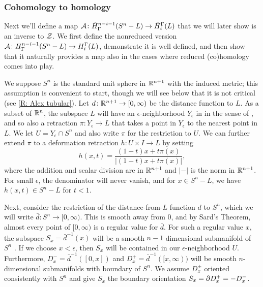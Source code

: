 \subsubsection{Cohomology to homology}
Next we'll define a map $\mathcal{A} \colon \tilde H^{n-i-1}_\Gamma(S^n-L) \to \tilde H_i^\Gamma(L)$ that we will later show is an inverse to $\mathcal{Z}$.
We first define the nonreduced version $\mathcal{A} \colon H^{n-i-1}_\Gamma(S^n-L) \to H_i^\Gamma(L)$, demonstrate it is well defined, and then show that it naturally provides a map also in the cases where reduced (co)homology comes into play.

We suppose $S^n$ is the standard unit sphere in $\mathbb{R}^{n+1}$ with the induced metric; this assumption is convenient to start, though we will see below that it is not critical (see \cref{R: Alex tubular}).
Let $d \colon \mathbb{R}^{n+1} \to [0,\infty)$ be the distance function to $L$.
As a subset of $\mathbb{R}^n$, the subspace $L$ will have an $\epsilon$-neighborhood $Y_\epsilon$ in in the sense of \cite[Section 2.3]{GuPo74}, and so also a retraction $\pi \colon Y_\epsilon \to L$ that takes a point in $Y_\epsilon$ to the nearest point in $L$.
We let $U = Y_\epsilon \cap S^n$ and also write $\pi$ for the restriction to $U$.
We can further extend $\pi$ to a deformation retraction $h \colon U \times I \to L$ by setting
\begin{equation}\label{E: alex retraction}
	h(x,t) = \frac{(1-t)x + t\pi(x)}{|(1-t)x + t\pi(x)|},
\end{equation}
where the addition and scalar division are in $\mathbb{R}^{n+1}$ and $|-|$ is the norm in $\mathbb{R}^{n+1}$.
For small $\epsilon$, the denominator will never vanish, and for $x \in S^n -L$, we have $h(x,t) \in S^n -L$ for $t < 1$.

Next, consider the restriction of the distance-from-$L$ function $d$ to $S^n$, which we will write $\bar d \colon S^n \to [0,\infty)$.
This is smooth away from $0$, and by Sard's Theorem, almost every point of $[0,\infty)$ is a regular value for $\bar d$.
For such a regular value $x$, the subspace $S_x = \bar d^{-1}(x)$ will be a smooth $n-1$ dimensional submanifold of $S^n$ \cite[Section 2.1]{GuPo74}.
If we choose $x < \epsilon$, then $S_x$ will be contained in our $\epsilon$-neighborhood $U$.
Furthermore, $D_x^- = \bar d^{-1}([0,x])$ and $D_x^+ = \bar d^{-1}([x,\infty))$ will be smooth $n$-dimensional submanifolds with boundary of $S^n$.
We assume $D^{\pm}_x$ oriented consistently with $S^n$ and give $S_x$ the boundary orientation $S_x = \partial D_x^+ = -D_x^-$.


